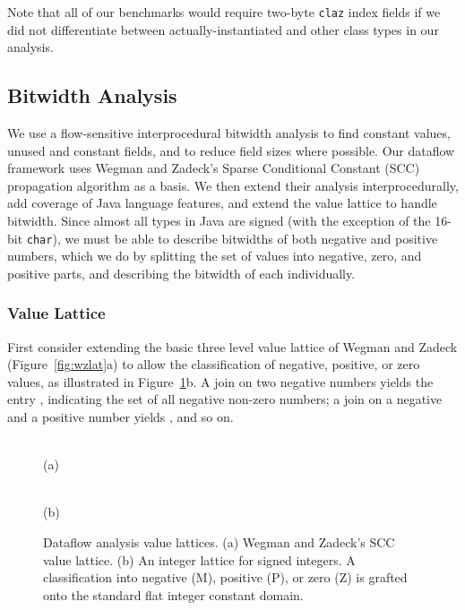 \documentclass[oribibl]{llncs}
\newcommand{\figscale}{1.0}
\begin{document}
Note that all of our benchmarks would require two-byte {\tt claz}
index fields if we did not differentiate between actually-instantiated
and other class types in our analysis.


\subsection{Bitwidth Analysis}
We use a flow-sensitive interprocedural bitwidth analysis to
find constant values, unused and constant fields, and to reduce
field sizes where possible.  Our dataflow framework uses
Wegman and Zadeck's Sparse Conditional Constant (SCC) propagation
algorithm \cite{wegman91:scc} as a basis.  We then extend their
analysis interprocedurally, add coverage of Java language features,
and extend the value lattice to handle bitwidth.
Since almost all types in Java are signed (with the exception of the
16-bit {\tt char}), we must be able to describe bitwidths of both
negative and positive numbers, which we do by splitting the set of
values into negative, zero, and positive parts, and describing the
bitwidth of each individually.

\subsubsection{Value Lattice}
First consider extending the basic three level value lattice of Wegman and
Zadeck (Figure~\ref{fig:wzlat}a) to allow the classification of
negative, positive, or zero
values, as illustrated in Figure~\ref{fig:scclat6}b.
A join on two negative numbers yields the entry ,
indicating the set of all negative non-zero numbers; a
join on a negative and a positive number yields , and so on.
\begin{figure}[tp]%
\begin{center}%
\parbox[b]{6cm}{\centering%
\renewcommand{\figscale}{0.4}\\[.3cm]
(a)}%
\parbox[b]{6cm}{\centering%
\renewcommand{\color}[2][rgb]{}%
\renewcommand{\figscale}{0.4}\\
(b)}%
\end{center}
\caption{Dataflow analysis value lattices.
(a) Wegman and Zadeck's SCC value lattice.
(b) An integer lattice for signed integers.
A classification into
negative (M), positive (P), or zero (Z) is grafted onto the standard
flat integer constant domain.}
\label{fig:wzlat}\label{fig:scclat6}
\end{figure}
\end{document}
